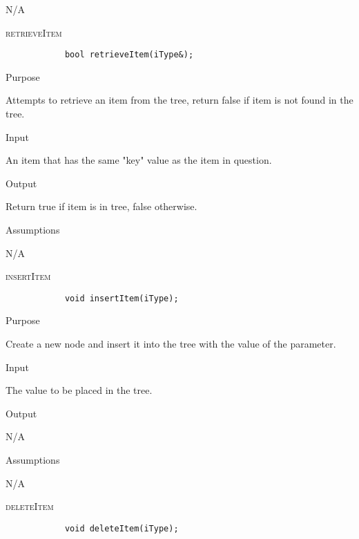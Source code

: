 \documentclass[pdftex, 12pt]{article}
\begin{document}
\begin{description}
\begin{description}
				N/A

		\end{description}
	\item{\textsc{retrieveItem}}
		\begin{lstlisting}
			bool retrieveItem(iType&);
		\end{lstlisting}
		\begin{description}

			\item{Purpose}

				Attempts to retrieve an item from the tree, return false if item is not found in the tree.

			\item{Input}

				An item that has the same "key" value as the item in question.

			\item{Output}

				Return true if item is in tree, false otherwise.

			\item{Assumptions}

				N/A

		\end{description}
	\item{\textsc{insertItem}}
		\begin{lstlisting}
			void insertItem(iType);
		\end{lstlisting}
		\begin{description}

			\item{Purpose}

				Create a new node and insert it into the tree with the value of the parameter.

			\item{Input}

				The value to be placed in the tree.

			\item{Output}

				N/A

			\item{Assumptions}

				N/A

		\end{description}
	\item{\textsc{deleteItem}}
		\begin{lstlisting}
			void deleteItem(iType);
		\end{lstlisting}
		\begin{description}


\end{description}
\end{description}
\end{document}
